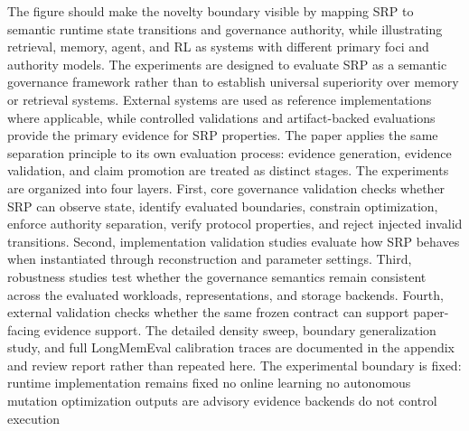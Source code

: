 {}\markdownRendererInterblockSeparator
{}The figure should make the novelty boundary visible by mapping SRP to semantic runtime state transitions and governance authority, while illustrating retrieval, memory, agent, and RL as systems with different primary foci and authority models.\markdownRendererInterblockSeparator
{}
\markdownRendererSectionEnd 
\markdownRendererSectionEnd \markdownRendererSectionBegin
{}\markdownRendererInterblockSeparator
{}The experiments are designed to evaluate SRP as a semantic governance framework rather than to establish universal superiority over memory or retrieval systems. External systems are used as reference implementations where applicable, while controlled validations and artifact-backed evaluations provide the primary evidence for SRP properties.\markdownRendererParagraphSeparator
{}The paper applies the same separation principle to its own evaluation process: evidence generation, evidence validation, and claim promotion are treated as distinct stages.\markdownRendererParagraphSeparator
{}The experiments are organized into four layers. First, core governance validation checks whether SRP can observe state, identify evaluated boundaries, constrain optimization, enforce authority separation, verify protocol properties, and reject injected invalid transitions. Second, implementation validation studies evaluate how SRP behaves when instantiated through reconstruction and parameter settings. Third, robustness studies test whether the governance semantics remain consistent across the evaluated workloads, representations, and storage backends. Fourth, external validation checks whether the same frozen contract can support paper-facing evidence support.\markdownRendererParagraphSeparator
{}The detailed density sweep, boundary generalization study, and full LongMemEval calibration traces are documented in the appendix and review report rather than repeated here.\markdownRendererParagraphSeparator
{}The experimental boundary is fixed:\markdownRendererInterblockSeparator
{}\markdownRendererUlBeginTight
\markdownRendererUlItem runtime implementation remains fixed\markdownRendererUlItemEnd 
\markdownRendererUlItem no online learning\markdownRendererUlItemEnd 
\markdownRendererUlItem no autonomous mutation\markdownRendererUlItemEnd 
\markdownRendererUlItem optimization outputs are advisory\markdownRendererUlItemEnd 
\markdownRendererUlItem evidence backends do not control execution\markdownRendererUlItemEnd 
